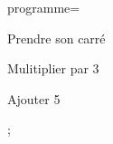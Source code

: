 \documentclass[exercice]{thedocument}%
\begin{document}
%
    \>programme={\item Prendre son carré\item Mulitiplier par 3\item%
    Ajouter 5};%
\end{document}
